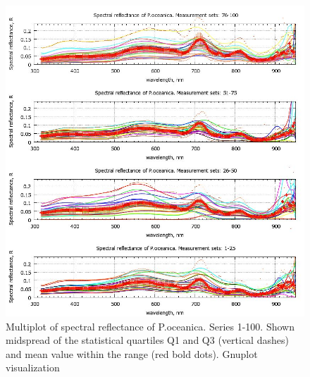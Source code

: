 \documentclass[10pt, a4paper]{article}
\begin{document}
\begin{figure}
\begin{center}
\includegraphics[scale=0.45]{GNU-13.jpg}
\caption{Multiplot of spectral reflectance of P.oceanica. Series 1-100. Shown midspread of the statistical quartiles Q1 and Q3 (vertical dashes) and
mean value within the range (red bold dots). Gnuplot visualization­}
\label{fig:35}
\end{center}
\end{figure}
\end{document}

